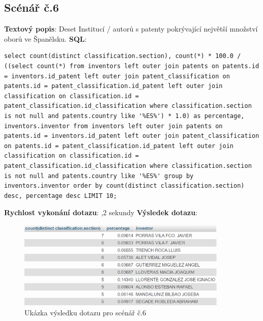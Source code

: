\newpage
\subsection{Scénář č.6}
\textbf{Textový popis}: Deset Institucí / autorů s patenty pokrývající největší množství oborů ve Španělsku.
\newline
\textbf{SQL}: 
\begin{lstlisting}[label = {lst:elements_a}]
select count(distinct classification.section), count(*) * 100.0 / ((select count(*) from inventors left outer join patents on patents.id = inventors.id_patent left outer join patent_classification on patents.id = patent_classification.id_patent left outer join classification on classification.id = patent_classification.id_classification where classification.section is not null and patents.country like '%ES%') * 1.0) as percentage, inventors.inventor from inventors left outer join patents on patents.id = inventors.id_patent left outer join patent_classification on patents.id = patent_classification.id_patent left outer join classification on classification.id = patent_classification.id_classification where classification.section is not null and patents.country like '%ES%' group by inventors.inventor order by count(distinct classification.section) desc, percentage desc LIMIT 10;
\end{lstlisting}
\textbf{Rychlost vykonání dotazu}: ,2 sekundy
\newline
\textbf{Výsledek dotazu}:
\begin{figure}[H]
\centering
\includegraphics[width=10cm]{img/scenare/scenar_6}
\caption{Ukázka výsledku dotazu pro scénář č.6}
\label{fig:scenar6}
\end{figure}

\newpage
